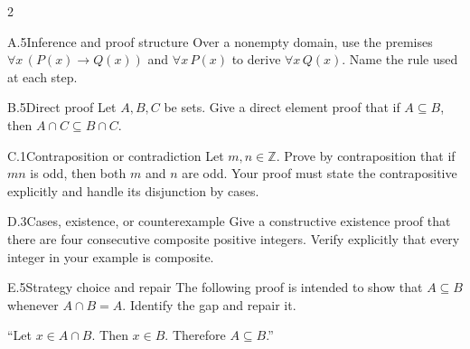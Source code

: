 \documentclass[9pt]{extarticle}
\begin{document}
\begin{multicols}{2}
\begin{CoreProblem}{A.5}{Inference and proof structure}
Over a nonempty domain, use the premises
$\forall x\,(P(x)\to Q(x))$ and $\forall x\,P(x)$ to derive
$\forall x\,Q(x)$. Name the rule used at each step.
\end{CoreProblem}
\begin{CoreProblem}{B.5}{Direct proof}
Let $A,B,C$ be sets. Give a direct element proof that if $A\subseteq B$, then
$A\cap C\subseteq B\cap C$.
\end{CoreProblem}
\begin{CoreProblem}{C.1}{Contraposition or contradiction}
Let $m,n\in\mathbb Z$. Prove by contraposition that if $mn$ is odd, then both
$m$ and $n$ are odd. Your proof must state the contrapositive explicitly and
handle its disjunction by cases.
\end{CoreProblem}
\columnbreak
\begin{CoreProblem}{D.3}{Cases, existence, or counterexample}
Give a constructive existence proof that there are four consecutive composite
positive integers. Verify explicitly that every integer in your example is
composite.
\end{CoreProblem}
\begin{CoreProblem}{E.5}{Strategy choice and repair}
The following proof is intended to show that $A\subseteq B$ whenever
$A\cap B=A$. Identify the gap and repair it.

``Let $x\in A\cap B$. Then $x\in B$. Therefore $A\subseteq B$.''
\end{CoreProblem}
\end{multicols}
\CoreWorkArea
\FormBreak
{}
\end{document}
